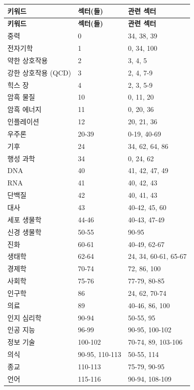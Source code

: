 \documentclass[13pt,a4paper]{article}
\begin{document}
	\begin{longtable}{|p{5cm}|p{3cm}|p{4cm}|}
		\hline
		\textbf{키워드} & \textbf{섹터(들)} & \textbf{관련 섹터} \\
		\hline
		\endfirsthead
		\hline
		\textbf{키워드} & \textbf{섹터(들)} & \textbf{관련 섹터} \\
		\hline
		\endhead
		
		중력 & 0 & 34, 38, 39 \\
		전자기학 & 1 & 0, 34, 100 \\
		약한 상호작용 & 2 & 3, 4, 5 \\
		강한 상호작용 (QCD) & 3 & 2, 4, 7-9 \\
		힉스 장 & 4 & 2, 3, 5-9 \\
		암흑 물질 & 10 & 0, 11, 20 \\
		암흑 에너지 & 11 & 0, 20, 36 \\
		인플레이션 & 12 & 20, 21, 36 \\
		우주론 & 20-39 & 0-19, 40-69 \\
		기후 & 24 & 34, 62, 64, 86 \\
		행성 과학 & 34 & 0, 24, 62 \\
		DNA & 40 & 41, 42, 47, 49 \\
		RNA & 41 & 40, 42, 43 \\
		단백질 & 42 & 40, 41, 43 \\
		대사 & 43 & 40-42, 45, 60 \\
		세포 생물학 & 44-46 & 40-43, 47-49 \\
		신경 생물학 & 50-55 & 90-95 \\
		진화 & 60-61 & 40-49, 62-67 \\
		생태학 & 62-64 & 24, 34, 60-61, 65-67 \\
		경제학 & 70-74 & 72, 86, 100 \\
		사회학 & 75-76 & 77-79, 80-85 \\
		인구학 & 86 & 24, 62, 70-74 \\
		의료 & 89 & 40-46, 86, 100 \\
		인지 심리학 & 90-94 & 50-55, 95 \\
		인공 지능 & 96-99 & 90-95, 100-102 \\
		정보 기술 & 100-102 & 70-74, 89, 103-106 \\
		의식 & 90-95, 110-113 & 50-55, 114 \\
		종교 & 110-113 & 75-79, 90-95 \\
		언어 & 115-116 & 90-94, 108-109 \\
		\hline
	\end{longtable}
	
\end{document}
